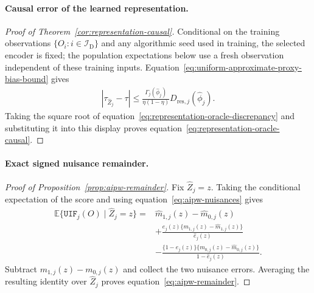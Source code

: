 \paragraph{Causal error of the learned representation.}
\begin{proof}[Proof of Theorem~\ref{cor:representation-causal}]
Conditional on the training observations $\{O_i:i\in\mathcal I_{\mathrm D}\}$ and any algorithmic seed used in training, the selected encoder is fixed; the population expectations below use a fresh observation independent of these training inputs. Equation~\eqref{eq:uniform-approximate-proxy-bias-bound} gives
\begin{align}
|\tau_{\widehat Z_j}-\tau|
\le
\frac{\Gamma_j(\widehat\phi_j)}{\eta(1-\eta)}
D_{\mathrm{res},j}(\widehat\phi_j).
\end{align}
Taking the square root of equation~\eqref{eq:representation-oracle-discrepancy} and substituting it into this display proves equation~\eqref{eq:representation-oracle-causal}.
\end{proof}

\paragraph{Exact signed nuisance remainder.}
\begin{proof}[Proof of Proposition~\ref{prop:aipw-remainder}]
Fix $\widehat Z_j=z$. Taking the conditional expectation of the score and using equation~\eqref{eq:aipw-nuisances} gives
\begin{align}
\mathbb E\{\mathtt{UIF}_j(O)\mid\widehat Z_j=z\}
={}&
\widehat m_{1,j}(z)-\widehat m_{0,j}(z)
\nonumber\\
&+
\frac{e_j(z)\{m_{1,j}(z)-\widehat m_{1,j}(z)\}}
{\widehat e_j(z)}
\nonumber\\
&-
\frac{\{1-e_j(z)\}\{m_{0,j}(z)-\widehat m_{0,j}(z)\}}
{1-\widehat e_j(z)}.
\end{align}
Subtract $m_{1,j}(z)-m_{0,j}(z)$ and collect the two nuisance errors. Averaging the resulting identity over $\widehat Z_j$ proves equation~\eqref{eq:aipw-remainder}.
\end{proof}

